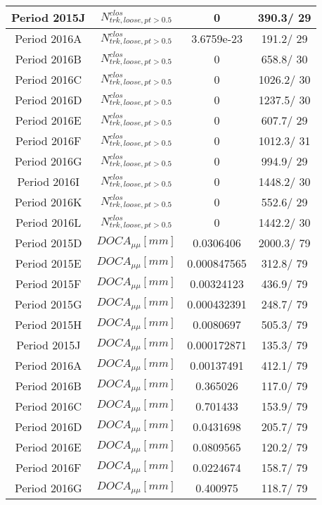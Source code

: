 \documentclass{article}
\begin{document}
\begin{longtable}{c|c|c|c}
\hline
 Period 2015J & $N^{clos}_{trk, loose, pt>0.5}$ & 0 & 390.3/ 29\\
\hline
 Period 2016A & $N^{clos}_{trk, loose, pt>0.5}$ & 3.6759e-23 & 191.2/ 29\\
\hline
 Period 2016B & $N^{clos}_{trk, loose, pt>0.5}$ & 0 & 658.8/ 30\\
\hline
 Period 2016C & $N^{clos}_{trk, loose, pt>0.5}$ & 0 & 1026.2/ 30\\
\hline
 Period 2016D & $N^{clos}_{trk, loose, pt>0.5}$ & 0 & 1237.5/ 30\\
\hline
 Period 2016E & $N^{clos}_{trk, loose, pt>0.5}$ & 0 & 607.7/ 29\\
\hline
 Period 2016F & $N^{clos}_{trk, loose, pt>0.5}$ & 0 & 1012.3/ 31\\
\hline
 Period 2016G & $N^{clos}_{trk, loose, pt>0.5}$ & 0 & 994.9/ 29\\
\hline
 Period 2016I & $N^{clos}_{trk, loose, pt>0.5}$ & 0 & 1448.2/ 30\\
\hline
 Period 2016K & $N^{clos}_{trk, loose, pt>0.5}$ & 0 & 552.6/ 29\\
\hline
 Period 2016L & $N^{clos}_{trk, loose, pt>0.5}$ & 0 & 1442.2/ 30\\
\hline
 Period 2015D & $DOCA_{\mu\mu} [mm]$ & 0.0306406 & 2000.3/ 79\\
\hline
 Period 2015E & $DOCA_{\mu\mu} [mm]$ & 0.000847565 & 312.8/ 79\\
\hline
 Period 2015F & $DOCA_{\mu\mu} [mm]$ & 0.00324123 & 436.9/ 79\\
\hline
 Period 2015G & $DOCA_{\mu\mu} [mm]$ & 0.000432391 & 248.7/ 79\\
\hline
 Period 2015H & $DOCA_{\mu\mu} [mm]$ & 0.0080697 & 505.3/ 79\\
\hline
 Period 2015J & $DOCA_{\mu\mu} [mm]$ & 0.000172871 & 135.3/ 79\\
\hline
 Period 2016A & $DOCA_{\mu\mu} [mm]$ & 0.00137491 & 412.1/ 79\\
\hline
 Period 2016B & $DOCA_{\mu\mu} [mm]$ & 0.365026 & 117.0/ 79\\
\hline
 Period 2016C & $DOCA_{\mu\mu} [mm]$ & 0.701433 & 153.9/ 79\\
\hline
 Period 2016D & $DOCA_{\mu\mu} [mm]$ & 0.0431698 & 205.7/ 79\\
\hline
 Period 2016E & $DOCA_{\mu\mu} [mm]$ & 0.0809565 & 120.2/ 79\\
\hline
 Period 2016F & $DOCA_{\mu\mu} [mm]$ & 0.0224674 & 158.7/ 79\\
\hline
 Period 2016G & $DOCA_{\mu\mu} [mm]$ & 0.400975 & 118.7/ 79\\

\end{longtable}
\end{document}
